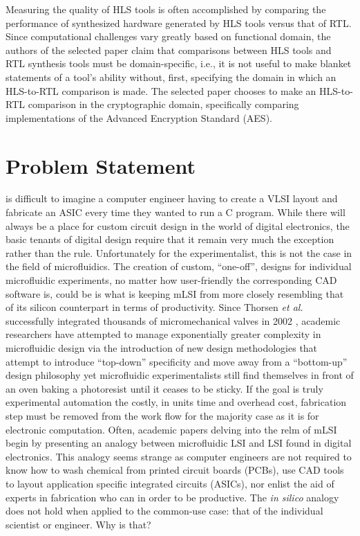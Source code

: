\documentclass[11pt,journal,compsoc, onecolumn]{IEEEtran}
\begin{document}
Measuring the quality of HLS tools is often accomplished by comparing the performance of synthesized hardware generated by HLS tools versus that of RTL. Since computational challenges vary greatly based on functional domain, the authors of the selected paper claim that comparisons between HLS tools and RTL synthesis tools must be domain-specific, i.e., it is not useful to  make blanket statements of a tool's ability without, first, specifying the domain in which an HLS-to-RTL comparison is made. The selected paper chooses to make an HLS-to-RTL comparison in the cryptographic domain, specifically comparing implementations of the Advanced Encryption Standard (AES).

\section{Problem Statement}
 is
difficult to imagine a computer engineer having to create a VLSI layout and
fabricate an ASIC every time they wanted to run a C program. While there will
always be a place for custom circuit design in the world of digital
electronics, the basic tenants of digital design require that it remain
very much the exception rather than the rule. Unfortunately for the
experimentalist, this is not the case in the field of microfluidics. 
The creation of custom, ``one-off'', designs
for individual microfluidic experiments, no matter how user-friendly the
corresponding CAD software is, could be is what is keeping mLSI from
more closely resembling that of its silicon counterpart in terms of
productivity. Since Thorsen \emph{et al.} successfully integrated thousands of
micromechanical valves in 2002 \cite{thorsen2002}, academic researchers have
attempted to manage exponentially greater complexity in microfluidic design via
the introduction of new design methodologies that attempt to introduce
``top-down'' specificity and move away from a ``bottom-up'' design philosophy
 \cite{minhass2013}\cite{melin2007}\cite{minhass2012} yet microfluidic
 experimentalists still find themselves in front of an oven baking a photoresist
until it ceases to be sticky. If the goal is truly experimental automation the
costly, in units time and overhead cost, fabrication step must be removed from the
work flow for the majority case as it is for electronic computation. 
Often, academic papers delving into the relm of mLSI begin by presenting an analogy
between microfluidic LSI and LSI found in digital electronics. This analogy seems
strange as computer engineers are not required to know how to wash chemical
from printed circuit boards (PCBs), use CAD tools to layout application
specific integrated circuits (ASICs), nor enlist the aid of experts in
fabrication who can in order to be productive.  The \emph{in
silico} analogy does not hold when applied to the common-use case: that of the
individual scientist or
engineer. Why is that? 
\end{document}
